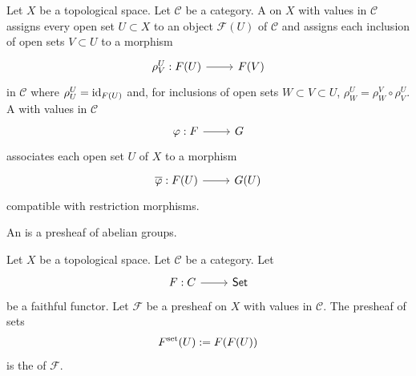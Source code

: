 \documentclass [11 pt, oneside] {article}
\begin{document}
\begin{definition}\label{sheafcat}\text{}
Let $X$ be a topological space. Let $\mathscr{C}$ be a category. A  on $X$ with values in $\mathscr{C}$ assigns every open set $U\subset X$ to an object $\mathscr{F}(U)$ of $\mathscr{C}$ and assigns each inclusion of open sets $V\subset U$ to a morphism
\[
\begin{tikzcd}
	\rho_{V}^{U} :\mathscr{F}(U)\ar[r]& \mathscr{F}(V)
\end{tikzcd}
\]
in $\mathscr{C}$ where $\rho_{U}^{U}=\operatorname{id}_{\relax{F}(U)}$ and, for inclusions of open sets $W\subset V\subset U$, $\rho_{W}^{U} = \rho_{W}^{V}\circ \rho_{V}^{U}$. 
A  with values in $\mathscr{C}$ 
\[
\begin{tikzcd}
	\varphi:\mathscr{F}\ar[r]& \mathscr{G}
\end{tikzcd}
\]
associates each open set $U$ of $X$ to a morphism
\[
\begin{tikzcd}
	\overline{\varphi} : \mathscr{F}(U)\ar[r]&  \mathscr{G}(U)
\end{tikzcd}
\]
compatible with restriction morphisms.
\end{definition}

\begin{definition}[ ]\label{}\text{}
An  is a presheaf of abelian groups.
\end{definition}

\begin{definition}\label{}\text{}
Let $X$ be a topological space. Let $\mathscr{C}$ be a category. Let
\[
\begin{tikzcd}
	F : \mathscr{C}\ar[r]& \catn{Set}
\end{tikzcd}
\]
be a faithful functor. 
Let $\mathscr{F}$ be a presheaf on $X$ with values in $\mathscr{C}$. The presheaf of sets
\begin{align*}
	\relax{F}^{\textup {set}}(U) := F (\relax{F}(U))
\end{align*}
is the  of $\mathscr{F}$.
\end{definition}

\end{document}
